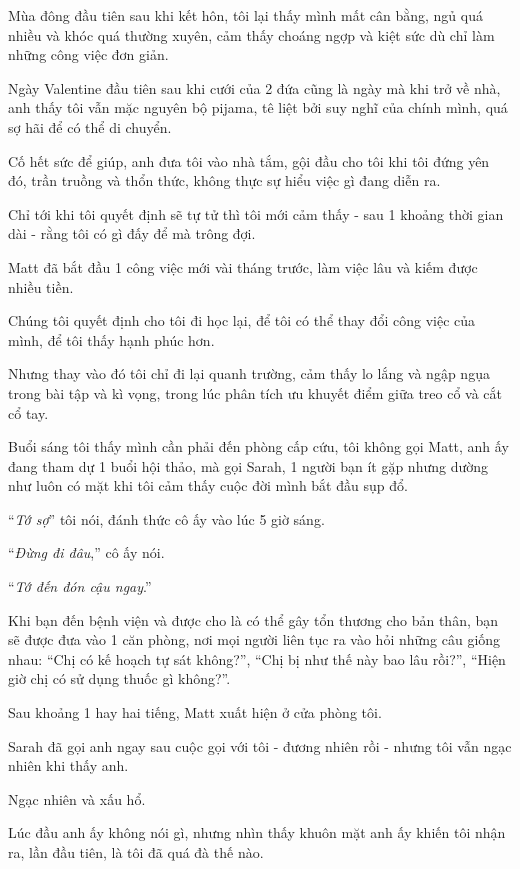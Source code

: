 \documentclass{book}
\numberwithin{equation}{section}
\begin{document}
Mùa đông đầu tiên sau khi kết hôn, tôi lại thấy mình mất cân bằng, ngủ quá nhiều và khóc quá thường xuyên, cảm thấy choáng ngợp và kiệt sức dù chỉ làm những công việc đơn giản.

%
Ngày Valentine đầu tiên sau khi cưới của 2 đứa cũng là ngày mà khi trở về nhà, anh thấy tôi vẫn mặc nguyên bộ pijama, tê liệt bởi suy nghĩ của chính mình, quá sợ hãi để có thể di chuyển.

Cố hết sức để giúp, anh đưa tôi vào nhà tắm, gội đầu cho tôi khi tôi đứng yên đó, trần truồng và thổn thức, không thực sự hiểu việc gì đang diễn ra.

Chỉ tới khi tôi quyết định sẽ tự tử thì tôi mới cảm thấy - sau 1 khoảng thời gian dài - rằng tôi có gì đấy để mà trông đợi.

Matt đã bắt đầu 1 công việc mới vài tháng trước, làm việc lâu và kiếm được nhiều tiền.

Chúng tôi quyết định cho tôi đi học lại, để tôi có thể thay đổi công việc của mình, để tôi thấy hạnh phúc hơn.

Nhưng thay vào đó tôi chỉ đi lại quanh trường, cảm thấy lo lắng và ngập ngụa trong bài tập và kì vọng, trong lúc phân tích ưu khuyết điểm giữa treo cổ và cắt cổ tay.

%
Buổi sáng tôi thấy mình cần phải đến phòng cấp cứu, tôi không gọi Matt, anh ấy đang tham dự 1 buổi hội thảo, mà gọi Sarah, 1 người bạn ít gặp nhưng dường như luôn có mặt khi tôi cảm thấy cuộc đời mình bắt đầu sụp đổ.

%
``\textit{Tớ sợ}'' tôi nói, đánh thức cô ấy vào lúc 5 giờ sáng.

%
``\textit{Đừng đi đâu},'' cô ấy nói.

``\textit{Tớ đến đón cậu ngay}.''

%
Khi bạn đến bệnh viện và được cho là có thể gây tổn thương cho bản thân, bạn sẽ được đưa vào 1 căn phòng, nơi mọi người liên tục ra vào hỏi những câu giống nhau: “Chị có kế hoạch tự sát không?”, “Chị bị như thế này bao lâu rồi?”, “Hiện giờ chị có sử dụng thuốc gì không?”.

%
Sau khoảng 1 hay hai tiếng, Matt xuất hiện ở cửa phòng tôi.

Sarah đã gọi anh ngay sau cuộc gọi với tôi - đương nhiên rồi - nhưng tôi vẫn ngạc nhiên khi thấy anh.

Ngạc nhiên và xấu hổ.

%
Lúc đầu anh ấy không nói gì, nhưng nhìn thấy khuôn mặt anh ấy khiến tôi nhận ra, lần đầu tiên, là tôi đã quá đà thế nào.
\end{document}
